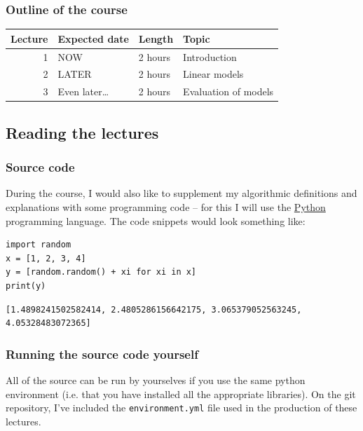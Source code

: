 \documentclass[10pt]{beamer}
\begin{document}
\subsubsection*{Outline of the course}
\label{sec:org57d40ed}

\begin{center}
\begin{tabular}{rlll}
\toprule
Lecture & Expected date & Length & Topic\\
\midrule
1 & NOW & 2 hours & Introduction\\
2 & LATER & 2 hours & Linear models\\
3 & Even later\ldots{} & 2 hours & Evaluation of models\\
\bottomrule
\end{tabular}
\end{center}

\subsection*{Reading the lectures}
\label{sec:org989be17}

\subsubsection*{Source code}
\label{sec:orgdf0ed7e}

During the course, I would also like to supplement my algorithmic definitions and
explanations with some programming code -- for this I will use the \href{https://www.python.org/}{Python} programming
language. The code snippets would look something like:

\begin{verbatim}
import random
x = [1, 2, 3, 4]
y = [random.random() + xi for xi in x]
print(y)
\end{verbatim}

\begin{verbatim}
[1.4898241502582414, 2.4805286156642175, 3.065379052563245, 4.05328483072365]
\end{verbatim}

\subsubsection*{Running the source code yourself}
\label{sec:org56e7055}

All of the source can be run by yourselves if you use the same python environment
(i.e. that you have installed all the appropriate libraries). On the git repository,
I've included the \texttt{environment.yml} file used in the production of these lectures.
\end{document}

